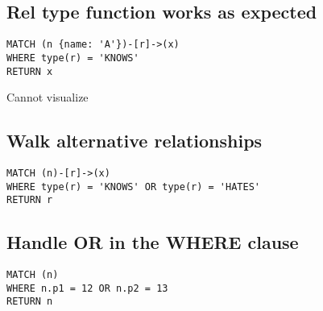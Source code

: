 \subsection{Rel type function works as expected}

\begin{lstlisting}
MATCH (n {name: 'A'})-[r]->(x)
WHERE type(r) = 'KNOWS'
RETURN x
\end{lstlisting}

Cannot visualize
\subsection{Walk alternative relationships}

\begin{lstlisting}
MATCH (n)-[r]->(x)
WHERE type(r) = 'KNOWS' OR type(r) = 'HATES'
RETURN r
\end{lstlisting}

\subsection{Handle OR in the WHERE clause}

\begin{lstlisting}
MATCH (n)
WHERE n.p1 = 12 OR n.p2 = 13
RETURN n
\end{lstlisting}

